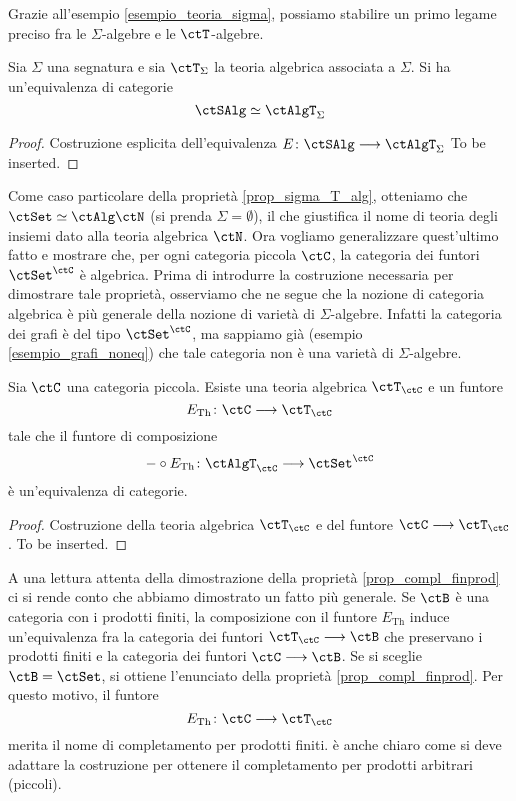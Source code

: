Grazie all'esempio \ref{esempio_teoria_sigma}, possiamo stabilire un primo legame preciso fra le $\Sigma$-algebre e le $\ctT$-algebre.

\begin{proposition}\label{prop_sigma_T_alg}
Sia $\Sigma$ una segnatura e sia $\ctT_{\Sigma}$ la teoria algebrica associata a $\Sigma$. Si ha un'equivalenza di categorie
\[
  \ctSAlg \simeq \ctAlgT_{\Sigma} 
\]
\end{proposition}

\begin{proof}
Costruzione esplicita dell'equivalenza $E \colon \ctSAlg \fun \ctAlgT_{\Sigma}$ To be inserted.
\end{proof} 

Come caso particolare della proprietà \ref{prop_sigma_T_alg}, otteniamo che $\ctSet \simeq \ctAlg\ctN$ (si prenda $\Sigma = \emptyset$),
il che giustifica il nome di teoria degli insiemi dato alla teoria algebrica $\ctN$. Ora vogliamo generalizzare quest'ultimo fatto e mostrare che, 
per ogni categoria piccola $\ctC$, la categoria dei funtori $\ctSet^{\ctC}$ è algebrica. Prima di introdurre la costruzione necessaria per 
dimostrare tale proprietà, osserviamo che ne segue che la nozione di categoria algebrica è più generale della nozione di varietà di 
$\Sigma$-algebre. Infatti la categoria dei grafi è del tipo $\ctSet^{\ctC}$, ma sappiamo già (esempio \ref{esempio_grafi_noneq}) che tale 
categoria non è una varietà di $\Sigma$-algebre.

\begin{proposition}\label{prop_compl_finprod}
Sia $\ctC$ una categoria piccola. Esiste una teoria algebrica $\ctT_{\ctC}$ e un funtore
\[
  E_{\mathrm{Th}} \colon \ctC \fun \ctT_{\ctC} 
\]
tale che il funtore di composizione
\[
  - \circ E_{\mathrm{Th}} \colon \ctAlgT_{\ctC} \fun \ctSet^{\ctC} 
\]
è un'equivalenza di categorie.
\end{proposition}

\begin{proof}
Costruzione della teoria algebrica $\ctT_{\ctC}$ e del funtore $\ctC \fun \ctT_{\ctC}$. To be inserted.
\end{proof}

\begin{remark}\label{oss_compl_finprod}
A una lettura attenta della dimostrazione della proprietà \ref{prop_compl_finprod} ci si rende conto che abbiamo dimostrato un fatto più 
generale. Se $\ctB$ è una categoria con i prodotti finiti, la composizione con il funtore $E_{\mathrm{Th}}$ induce un'equivalenza fra la 
categoria dei funtori $\ctT_{\ctC} \fun \ctB$ che preservano i prodotti finiti e la categoria dei funtori $\ctC \fun \ctB$. Se si sceglie 
$\ctB = \ctSet$, si ottiene l'enunciato della proprietà \ref{prop_compl_finprod}. Per questo motivo, il funtore 
\[
  E_{\mathrm{Th}} \colon \ctC \fun \ctT_{\ctC} 
\]
merita il nome di completamento per prodotti finiti. è anche chiaro come si deve adattare la costruzione per ottenere il completamento per
prodotti arbitrari (piccoli).
\end{remark}

